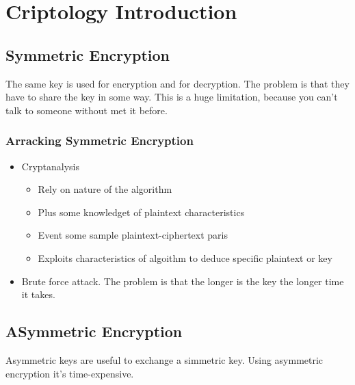 \section{Criptology Introduction}
\subsection{Symmetric Encryption}

The same key is used for encryption and for decryption.
The problem is that they have to share the key in some way. This is a huge
limitation, because you can't talk to someone without met it before.
\subsubsection{Arracking Symmetric Encryption}
\begin{itemize}
  \item Cryptanalysis
  \begin{itemize}
    \item Rely on nature of the algorithm
    \item Plus some knowledget of plaintext characteristics
    \item Event some sample plaintext-ciphertext paris
    \item Exploits characteristics of algoithm to deduce specific plaintext or
key
  \end{itemize}
  \item Brute force attack. The problem is that the longer is the key the
longer time it takes.
\end{itemize}

\subsection{ASymmetric Encryption}
Asymmetric keys are useful to exchange a simmetric key. Using asymmetric
encryption it's time-expensive.
